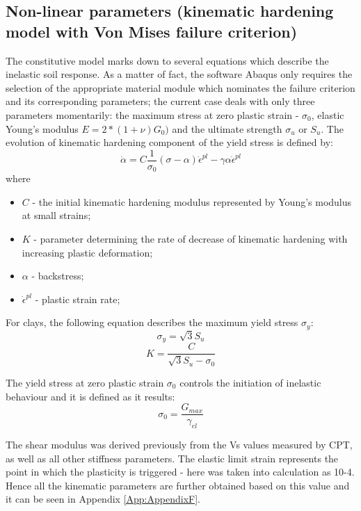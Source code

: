 \documentclass[10pt,a4paper]{report}
\begin{document}
\subsection{Non-linear parameters (kinematic hardening  model with Von Mises failure criterion)}
The constitutive model marks down to several equations which describe the inelastic soil response. As a matter of fact, the software Abaqus only requires the selection of the appropriate material module which nominates the failure criterion and its corresponding parameters; the current case deals with only three parameters momentarily: the maximum stress at zero plastic strain - $\sigma_0$, elastic Young's modulus $E=2*(1+\nu)G_0)$ and the ultimate strength $\sigma_u$ or $S_u$.
The evolution of kinematic hardening component of the yield stress is defined by:
\begin{equation}
		\dot{\alpha}=C\frac{1}{\sigma_0}(\sigma-\alpha)\dot{\epsilon}^{pl}-\gamma\alpha\dot{\epsilon}^{pl}
\end{equation}
where
\begin{itemize}
	\item $C$ - the initial kinematic hardening modulus represented by Young's modulus at small strains;
	\item $K$ - parameter determining the rate of decrease of kinematic hardening with increasing plastic deformation;
	\item $\alpha$ - backstress;
	\item $\dot{\epsilon}^{pl}$ - plastic strain rate;
\end{itemize}

For clays, the following equation describes the maximum yield stress $\sigma_y$:
\begin{equation}
	\sigma_y=\sqrt{3}S_u
\end{equation}
\begin{equation}
	K= \frac{C}{\sqrt{3}S_u-\sigma_0}
\end{equation}

The yield stress at zero plastic strain $\sigma_0$ controls the initiation of inelastic behaviour and it is defined as it results:
\begin{equation}
	\sigma_0=\frac{G_{max}}{\gamma_{el}}
\end{equation}

The shear modulus was derived previously from the Vs values measured by CPT, as well as all other stiffness parameters. The elastic limit strain represents the point in which the plasticity is triggered - here was taken into calculation as 10-4. Hence all the kinematic parameters are further obtained based on this value and it can be seen in Appendix \ref{App:AppendixF}.
\end{document}
